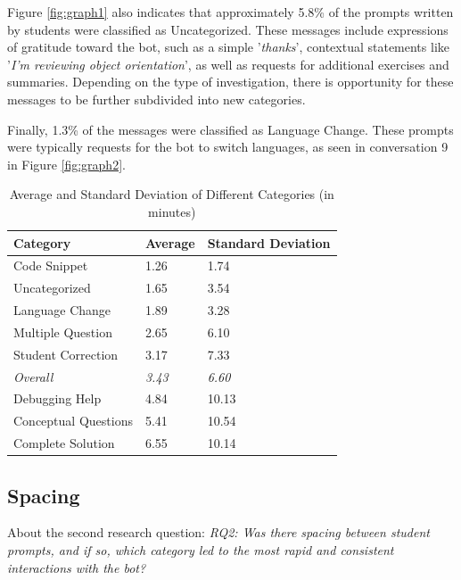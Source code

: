 \documentclass[a4paper,twoside]{article}
\begin{document}
Figure \ref{fig:graph1} also indicates that approximately 5.8\% of the prompts
written by students were classified as Uncategorized. These messages include
expressions of gratitude toward the bot, such as a simple '\textit{thanks}',
contextual statements like '\textit{I'm reviewing object orientation}', as well
as requests for additional exercises and summaries. Depending on the type of
investigation, there is opportunity for these messages to be further subdivided
into new categories.

Finally, 1.3\% of the messages were classified as Language Change. These prompts
were typically requests for the bot to switch languages, as seen in conversation
9 in Figure \ref{fig:graph2}.

\begin{table}[htbp]
  \caption{Average and Standard Deviation of Different Categories (in minutes)}
  \begin{center}
    \renewcommand{\arraystretch}{1.6} %
    \begin{tabular}{p{4cm} p{4cm} p{4cm}} %
      \hline
      \textbf{Category} & \textbf{Average} & \textbf{Standard Deviation} \\
      \hline
      Code Snippet & 1.26 & 1.74 \\
      Uncategorized & 1.65 & 3.54 \\
      Language Change & 1.89 & 3.28 \\
      Multiple Question & 2.65 & 6.10 \\
      Student Correction & 3.17 & 7.33 \\
      \hdashline
      \textit{Overall} & \textit{3.43} & \textit{6.60} \\
      \hdashline
      Debugging Help & 4.84 & 10.13 \\
      Conceptual Questions & 5.41 & 10.54 \\
      Complete Solution & 6.55 & 10.14 \\
      \hline
    \end{tabular}
    \label{tab:averages}
  \end{center}
\end{table}

\subsection{Spacing}

About the second research question: \textit{RQ2: Was there spacing between
student prompts, and if so, which category led to the most rapid and consistent
interactions with the bot?}
\end{document}
